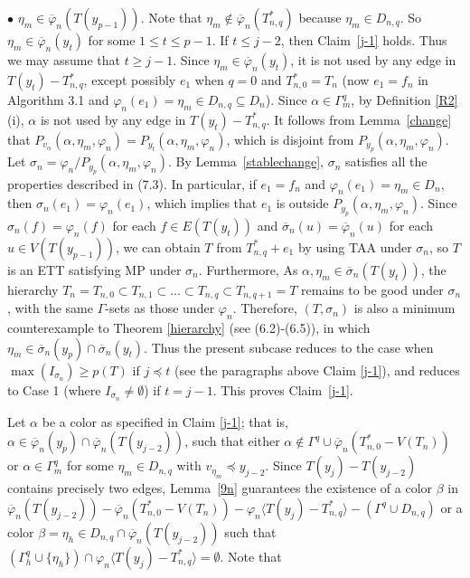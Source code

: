 \documentclass[11pt]{article}
\newcommand{\phibar}{\overline{\varphi}}
\begin{document}
$\bullet$ $\eta_m\in\phibar_n(T(y_{p-1}))$. Note that $\eta_m\notin\phibar_n(T_{n,q}^*)$ because $\eta_m\in D_{n,q}$. 
So $\eta_{m}\in\phibar_n(y_t)$ for some $1\leq t \leq p-1$. If $t\le j-2$, then Claim~\ref{j-1} holds. Thus we may assume
that $t \ge j-1$.  Since $\eta_m \in \phibar_n(y_t)$, it is not used by any edge in $T(y_t) -  T_{n,q}^*$, except possibly 
$e_1$ when $q=0$ and $T_{n,0}^*=T_n$ (now $e_1=f_n$ in Algorithm 3.1 and $\varphi_n(e_1)=\eta_m \in  D_{n,q} \subseteq  
D_n$). Since $\alpha \in\Gamma^{q}_m$, by Definition \ref{R2}(i), $\alpha$ is not used by any edge in $T(y_t) -  T_{n,q}^*$. 
It follows from Lemma~\ref{change} that $P_{v_{\alpha}} (\alpha, \eta_m, \varphi_n) = P_{y_t} (\alpha, \eta_m, \varphi_n)$,
which is disjoint from $P_{y_p} (\alpha,\eta_m, \varphi_n)$. Let $\sigma_n=\varphi_n/P_{y_p} (\alpha,\eta_m, \varphi_n)$. By Lemma~\ref{stablechange},  $\sigma_n$ satisfies all the properties described in (7.3). 
In particular, if $e_1=f_n$ and $\varphi_n(e_1)=\eta_m \in D_n$, then $\sigma_n(e_1)=\varphi_n(e_1)$, which 
implies that $e_1$ is outside $P_{y_p} (\alpha,\eta_m, \varphi_n)$. Since $\sigma_n(f)=\varphi_n(f)$ 
for each $f\in E(T(y_t))$ and $\overline{\sigma}_n(u)=\overline{\varphi}_n(u)$ for each $u\in V(T(y_{p-1}))$, we can 
obtain $T$ from $T_{n,q}^*+e_1$ by using TAA under $\sigma_n$, so $T$ is an ETT satisfying MP under $\sigma_n$. Furthermore,
As $\alpha, \eta_m \in \overline{\sigma}_n(T(y_t))$, the hierarchy $T_n=T_{n,0} \subset T_{n,1} \subset \ldots 
\subset T_{n,q} \subset T_{n,q+1}=T$ remains to be good under $\sigma_n$, with the same $\Gamma$-sets as those under 
$\varphi_n$. Therefore, $(T, \sigma_n)$ is also a minimum counterexample to Theorem \ref{hierarchy} (see (6.2)-(6.5)), 
in which $\eta_m \in \overline{\sigma}_n(y_p)\cap\overline{\sigma}_n(y_t)$. Thus the present subcase
reduces to the case when $\max(I_{\sigma_n}) \ge p(T)$ if $j \preceq t$ (see the paragraphs above
Claim \ref{j-1}), and reduces to Case 1 (where $I_{\sigma_n}\neq \emptyset$) if $t=j-1$. This proves 
Claim~\ref{j-1}. 

\vskip 3mm

Let $\alpha$ be a color as specified in Claim \ref{j-1}; that is, $\alpha\in\overline{\varphi}_n(y_p)\cap\overline{\varphi}_n(T(y_{j-2}))$, such that either $\alpha\notin\Gamma^q\cup \phibar_n(T_{n,0}^*-V(T_n))$ or $\alpha \in\Gamma^{q}_m$ for some $\eta_m\in D_{n,q}$ with $v_{\eta_m} \preceq y_{j-2}$.
Since $T(y_j)-T(y_{j-2})$ contains precisely two edges, Lemma~\ref{9n} guarantees the existence of a color $\beta$ in $\overline{\varphi}_n(T(y_{j-2}))- \phibar_n(T_{n,0}^*-V(T_n)) - \varphi_n \langle T(y_j) - T_{n,q}^* \rangle -
(\Gamma^{q}\cup D_{n,q} )$ or a color $\beta=\eta_{h}\in D_{n,q}\cap \phibar_n(T(y_{j-2}))$ such that $(\Gamma^{q}_h \cup \{\eta_{h}\}) \cap \varphi_n \langle T(y_j) - T_{n,q}^* \rangle=\emptyset$. Note that 
\end{document}
